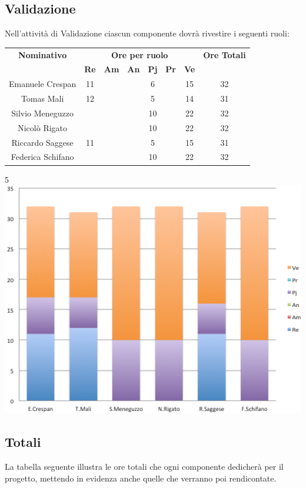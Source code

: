 \subsection{Validazione}
Nell’attività di Validazione ciascun componente dovrà rivestire i seguenti ruoli:
\begin{center}
  \centering
  \begin{tabular} {|c|c|c|c|c|c|c|c|}
    \hline
    \textbf{Nominativo} & \multicolumn{6}{|c|}{\textbf{Ore per ruolo}} & \textbf{Ore Totali} \\
    & \textbf{Re} & \textbf{Am} & \textbf{An} & \textbf{Pj} & \textbf{Pr} & \textbf{Ve} & \\
    \hline
    Emanuele Crespan &11 & & &6 & &15 &32\\
    \hline
    Tomas Mali &12 & & & 5& &14 &31\\
    \hline
    Silvio Meneguzzo & & & &10 & &22 &32\\
    \hline
    Nicolò Rigato & & & &10 & &22 &32\\
    \hline
    Riccardo Saggese &11 & & &5 & &15 &31\\
    \hline
    Federica Schifano & & & &10 & &22 &32\\
    \hline
  \end{tabular}
  5\includegraphics[scale=0.65]{img/fig6.png}
\end{center}

\subsection{Totali}
La tabella seguente illustra le ore totali che ogni componente dedicherà per il progetto, mettendo in evidenza anche quelle che verranno poi rendicontate.\\ \\


